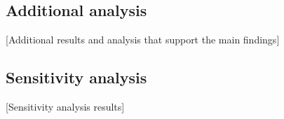 
\subsection{Additional analysis} \label{subsec:supp-additional-analysis}

[Additional results and analysis that support the main findings]

\subsection{Sensitivity analysis}

[Sensitivity analysis results]

